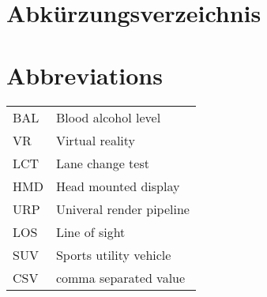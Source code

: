\ifmmtlanguagegerman
\section*{Abkürzungsverzeichnis}
\else
\section*{Abbreviations}
\fi

\begin{table}[h]		
	\begin{tabular}{ll}
		BAL & Blood alcohol level \\
		VR & Virtual reality \\
		LCT & Lane change test \\
		HMD & Head mounted display \\
		URP & Univeral render pipeline \\
		LOS & Line of sight \\
		SUV & Sports utility vehicle \\
		CSV & comma separated value \\
		

		
	\end{tabular}
\end{table}
